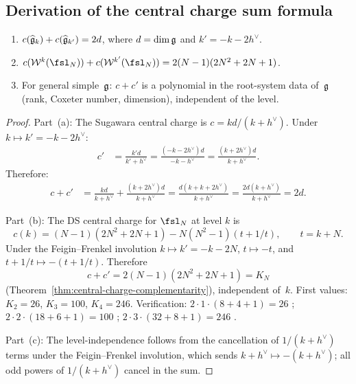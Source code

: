 %
%

\subsection{Derivation of the central charge sum formula}
\label{subsec:thqg-IV-cc-sum}

\begin{theorem}
\label{thm:thqg-IV-cc-sum}
\begin{enumerate}[label=\textup{(\alph*)}]
\item $c(\widehat{\mathfrak{g}}_k) + c(\widehat{\mathfrak{g}}_{k'}) = 2d$, where
 $d = \dim\mathfrak{g}$ and $k' = -k - 2h^\vee$.
\item $c(\mathcal{W}^k(\fsl_N)) + c(\mathcal{W}^{k'}(\fsl_N))
 = 2(N-1)(2N^2+2N+1)$.
\item For general simple~$\mathfrak{g}$: $c + c'$ is a polynomial in the
 root-system data of~$\mathfrak{g}$ (rank, Coxeter number, dimension),
 independent of the level.
\end{enumerate}
\end{theorem}

\begin{proof}
Part~(a): The Sugawara central charge is $c = kd/(k + h^\vee)$. Under
$k \mapsto k' = -k - 2h^\vee$:
\begin{align*}
c' &= \frac{k'd}{k' + h^\vee}
= \frac{(-k-2h^\vee)d}{-k-h^\vee}
= \frac{(k+2h^\vee)d}{k+h^\vee}.
\end{align*}
Therefore:
\begin{align*}
c + c' &= \frac{kd}{k+h^\vee} + \frac{(k+2h^\vee)d}{k+h^\vee}
= \frac{d(k + k + 2h^\vee)}{k + h^\vee}
= \frac{2d(k + h^\vee)}{k + h^\vee}
= 2d.
\end{align*}

Part~(b): The DS central charge for $\fsl_N$ at level $k$ is
\[
c(k) = (N-1)(2N^2+2N+1) - N(N^2-1)(t + 1/t), \qquad t = k + N.
\]
Under the Feigin--Frenkel involution $k \mapsto k' = -k - 2N$,
$t \mapsto -t$, and $t + 1/t \mapsto -(t + 1/t)$. Therefore
\[
c + c' = 2(N-1)(2N^2+2N+1) = K_N
\]
(Theorem~\ref{thm:central-charge-complementarity}),
independent of~$k$.
First values: $K_2 = 26$, $K_3 = 100$, $K_4 = 246$.
Verification: $2 \cdot 1 \cdot (8+4+1) = 26$ \checkmark;
$2 \cdot 2 \cdot (18+6+1) = 100$ \checkmark;
$2 \cdot 3 \cdot (32+8+1) = 246$ \checkmark.

Part~(c): The level-independence follows from the cancellation of $1/(k+h^\vee)$
terms under the Feigin--Frenkel involution, which sends
$k + h^\vee \mapsto -(k + h^\vee)$; all odd powers of $1/(k+h^\vee)$
cancel in the sum.
\end{proof}

